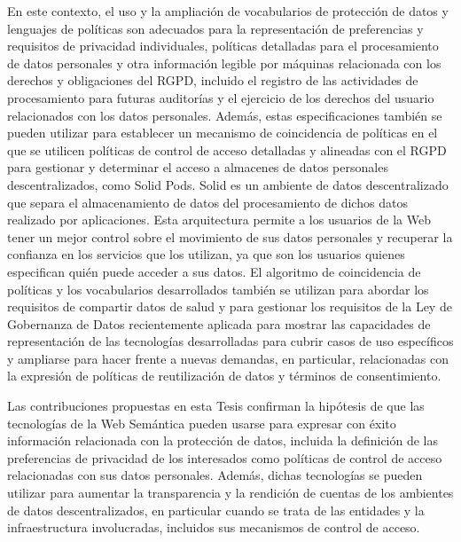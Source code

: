 En este contexto, el uso y la ampliación de vocabularios de protección de datos y lenguajes de políticas son adecuados para la representación de preferencias y requisitos de privacidad individuales, políticas detalladas para el procesamiento de datos personales y otra información legible por máquinas relacionada con los derechos y obligaciones del RGPD, incluido el registro de las actividades de procesamiento para futuras auditorías y el ejercicio de los derechos del usuario relacionados con los datos personales.
Además, estas especificaciones también se pueden utilizar para establecer un mecanismo de coincidencia de políticas en el que se utilicen políticas de control de acceso detalladas y alineadas con el RGPD para gestionar y determinar el acceso a almacenes de datos personales descentralizados, como Solid Pods.
Solid es un ambiente de datos descentralizado que separa el almacenamiento de datos del procesamiento de dichos datos realizado por aplicaciones.
Esta arquitectura permite a los usuarios de la Web tener un mejor control sobre el movimiento de sus datos personales y recuperar la confianza en los servicios que los utilizan, ya que son los usuarios quienes especifican quién puede acceder a sus datos.
El algoritmo de coincidencia de políticas y los vocabularios desarrollados también se utilizan para abordar los requisitos de compartir datos de salud y para gestionar los requisitos de la Ley de Gobernanza de Datos recientemente aplicada para mostrar las capacidades de representación de las tecnologías desarrolladas para cubrir casos de uso específicos y ampliarse para hacer frente a nuevas demandas, en particular, relacionadas con la expresión de políticas de reutilización de datos y términos de consentimiento.

Las contribuciones propuestas en esta Tesis confirman la hipótesis de que las tecnologías de la Web Semántica pueden usarse para expresar con éxito información relacionada con la protección de datos, incluida la definición de las preferencias de privacidad de los interesados como políticas de control de acceso relacionadas con sus datos personales.
Además, dichas tecnologías se pueden utilizar para aumentar la transparencia y la rendición de cuentas de los ambientes de datos descentralizados, en particular cuando se trata de las entidades y la infraestructura involucradas, incluidos sus mecanismos de control de acceso.
